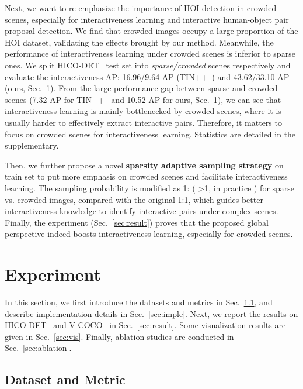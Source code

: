 \documentclass[runningheads]{llncs}
\begin{document}
Next, we want to re-emphasize the importance of HOI detection in crowded scenes, especially for interactiveness learning and interactive human-object pair proposal detection.
We find that crowded images occupy a large proportion of the HOI dataset, validating the effects brought by our method. 
Meanwhile, the performance of interactiveness learning under crowded scenes is inferior to sparse ones. We split HICO-DET~\cite{hicodet} test set into \textit{sparse/crowded} scenes respectively and evaluate the interactiveness AP: 
16.96/9.64 AP (TIN++~\cite{li2021transferable}) and  43.62/33.10 AP (ours, Sec.~\ref{sec:exp}). 
From the large performance gap between sparse and crowded scenes (7.32 AP for TIN++~\cite{li2021transferable} and 10.52 AP for ours, Sec.~\ref{sec:exp}), 
we can see that interactiveness learning is mainly bottlenecked by crowded scenes, where it is usually harder to effectively extract interactive pairs. Therefore, it matters to focus on crowded scenes for interactiveness learning. Statistics are detailed in the supplementary.

Then, we further propose a novel \textbf{sparsity adaptive sampling strategy} on train set to put more emphasis on crowded scenes and facilitate interactiveness learning. The sampling probability is modified as 1: ( \textgreater 1, in practice ) for sparse vs. crowded images, compared with the original 1:1,
which guides better interactiveness knowledge to identify interactive pairs under complex scenes.
Finally, the experiment (Sec.~\ref{sec:result}) proves that the proposed global perspective indeed boosts interactiveness learning, especially for crowded scenes.


\section{Experiment}\label{sec:exp}

In this section, we first introduce the datasets and metrics in Sec.~\ref{sec:dataset}, and describe implementation details in Sec.~\ref{sec:imple}. Next, we report the results on HICO-DET~\cite{hicodet} and V-COCO~\cite{vcoco} in Sec.~\ref{sec:result}. Some visualization results are given in Sec.~\ref{sec:vis}. Finally, ablation studies are conducted in Sec.~\ref{sec:ablation}.

\subsection{Dataset and Metric}\label{sec:dataset}
\end{document}
